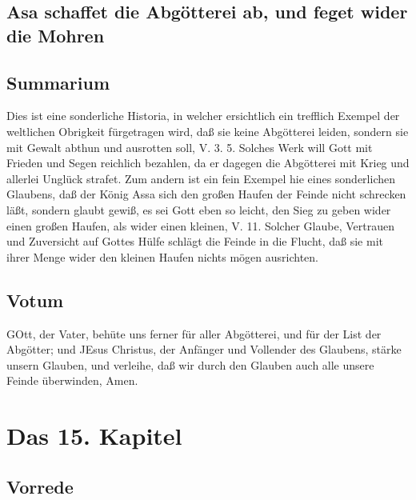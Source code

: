\section[Asa schaffet die Abgötterei ab, und feget wider]{Asa schaffet die Abgötterei ab, und feget wider die Mohren}

\section{Summarium}

Dies ist eine sonderliche Historia, in welcher ersichtlich ein trefflich Exempel der weltlichen Obrigkeit fürgetragen wird, daß sie keine Abgötterei leiden, sondern sie mit Gewalt abthun und ausrotten soll, V. 3. 5. Solches Werk will Gott mit Frieden und Segen reichlich bezahlen, da er dagegen die Abgötterei mit Krieg und allerlei Unglück strafet. Zum andern ist ein fein Exempel hie eines
sonderlichen Glaubens, daß der König Assa sich den großen Haufen der Feinde nicht schrecken läßt, sondern glaubt gewiß, es sei Gott eben so leicht, den Sieg zu geben wider einen großen Haufen, als wider einen kleinen, V. 11. Solcher Glaube, Vertrauen und Zuversicht auf Gottes Hülfe schlägt die Feinde in die Flucht, daß sie mit ihrer Menge wider den kleinen Haufen nichts mögen ausrichten.

\section{Votum}

GOtt, der Vater, behüte uns ferner für aller Abgötterei, und für der List der Abgötter; und JEsus Christus, der Anfänger und Vollender des Glaubens, stärke unsern Glauben, und verleihe, daß wir durch den Glauben auch alle unsere Feinde überwinden, Amen.

\chapter{Das 15. Kapitel}

\section{Vorrede}

